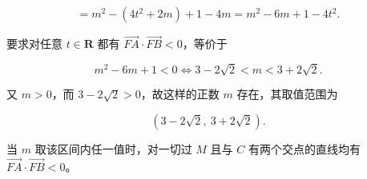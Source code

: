 \begin{answer}
\nopagebreak[4]
\[=m^2-(4t^2+2m)+1-4m=m^2-6m+1-4t^2.\]

要求对任意 $t\in\mathbf R$ 都有 $\overrightarrow{FA}\cdot\overrightarrow{FB}<0$，等价于

\nopagebreak[4]
\[m^2-6m+1<0\iff 3-2\sqrt2<m<3+2\sqrt2.\]

又 $m>0$，而 $3-2\sqrt2>0$，故这样的正数 $m$ 存在，其取值范围为

\nopagebreak[4]
\[\left(3-2\sqrt2,\ 3+2\sqrt2\right).\]

当 $m$ 取该区间内任一值时，对一切过 $M$ 且与 $C$ 有两个交点的直线均有 $\overrightarrow{FA}\cdot\overrightarrow{FB}<0$。


\end{answer}

